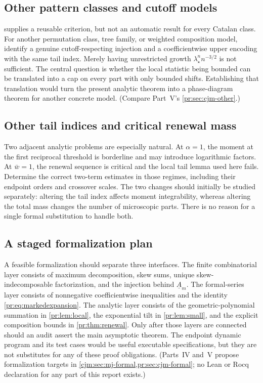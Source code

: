 \documentclass[11pt,a4paper]{article}
\theoremstyle{definition}\newaliascnt{definition}{theorem}
\theoremstyle{remark}\newaliascnt{remark}{theorem}
\begin{document}
\subsection{Other pattern classes and cutoff models}
\label{pr:sec:q-classes}
 supplies a reusable criterion, but not an
automatic result for every Catalan class. For another permutation class,
tree family, or weighted composition model, identify a genuine
cutoff-respecting injection and a coefficientwise upper encoding with the
same tail index. Merely having unrestricted growth $\lambda_\star^n n^{-3/2}$
is not sufficient. The central question is whether the local statistic being
bounded can be translated into a cap on every part with only bounded shifts.
Establishing that translation would turn the present analytic theorem into a
phase-diagram theorem for another concrete model. (Compare Part~V's
\cref{pr:sec:cjm-other}.)

\subsection{Other tail indices and critical renewal mass}
\label{pr:sec:q-tails}
Two adjacent analytic problems are especially natural. At $\alpha=1$, the
moment at the first reciprocal threshold is borderline and may introduce
logarithmic factors. At $\bar w=1$, the renewal sequence is critical and the
local tail lemma used here fails. Determine the correct two-term estimates in
those regimes, including their endpoint orders and crossover scales. The two
changes should initially be studied separately: altering the tail index
affects moment integrability, whereas altering the total mass changes the
number of microscopic parts. There is no reason for a single formal
substitution to handle both.

\subsection{A staged formalization plan}
\label{pr:sec:q-formal}
A feasible formalization should separate three interfaces. The finite
combinatorial layer consists of maximum decomposition, skew sums, unique
skew-indecomposable factorization, and the injection behind
$\underline A_m$. The formal-series layer consists of nonnegative
coefficientwise inequalities and the identity \eqref{pr:eq:markedexpansion}.
The analytic layer consists of the geometric-polynomial summation in
\cref{pr:lem:local}, the exponential tilt in \cref{pr:lem:small}, and the
explicit composition bounds in \cref{pr:thm:renewal}. Only after those layers
are connected should an audit assert the main asymptotic theorem. The
endpoint dynamic program and its test cases would be useful executable
specifications, but they are not substitutes for any of these proof
obligations. (Parts~IV and~V propose formalization targets in
\cref{cjm:sec:mj-formal,pr:sec:cjm-formal}; no Lean or Rocq declaration for
any part of this report exists.)
\end{document}
